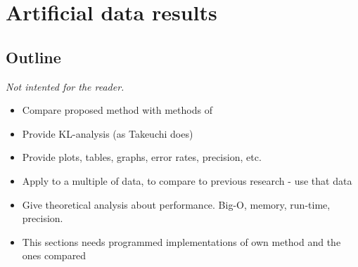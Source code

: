 
\chapter{Artificial data results}

\label{Chapter5} %


\section{Outline}
\emph{Not intented for the reader.}
\begin{itemize}
  \item Compare proposed method with methods of 
  \item Provide KL-analysis (as Takeuchi does)
  \item Provide plots, tables, graphs, error rates, precision, etc.
  \item Apply to a multiple of data, to compare to previous research - use that data
  \item Give theoretical analysis about performance. Big-O, memory, run-time, precision.
  \item This sections needs programmed implementations of own method and the ones compared
\end{itemize}




